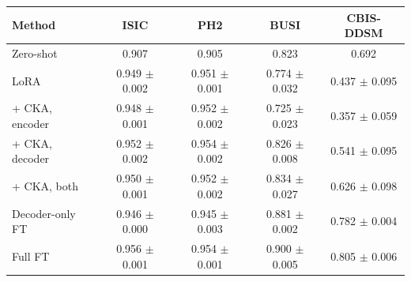 \begin{tabular}{lcccc}
\toprule
Method & ISIC & PH2 & BUSI & CBIS-DDSM \\
\midrule
Zero-shot & 0.907 & 0.905 & 0.823 & 0.692 \\
\midrule
LoRA & 0.949 $\pm$ 0.002 & 0.951 $\pm$ 0.001 & 0.774 $\pm$ 0.032 & 0.437 $\pm$ 0.095 \\
\quad + CKA, encoder & 0.948 $\pm$ 0.001 & 0.952 $\pm$ 0.002 & 0.725 $\pm$ 0.023 & 0.357 $\pm$ 0.059 \\
\quad + CKA, decoder & 0.952 $\pm$ 0.002 & 0.954 $\pm$ 0.002 & 0.826 $\pm$ 0.008 & 0.541 $\pm$ 0.095 \\
\quad + CKA, both & 0.950 $\pm$ 0.001 & 0.952 $\pm$ 0.002 & 0.834 $\pm$ 0.027 & 0.626 $\pm$ 0.098 \\
\midrule
Decoder-only FT & 0.946 $\pm$ 0.000 & 0.945 $\pm$ 0.003 & 0.881 $\pm$ 0.002 & 0.782 $\pm$ 0.004 \\
Full FT & 0.956 $\pm$ 0.001 & 0.954 $\pm$ 0.001 & 0.900 $\pm$ 0.005 & 0.805 $\pm$ 0.006 \\
\bottomrule
\end{tabular}
